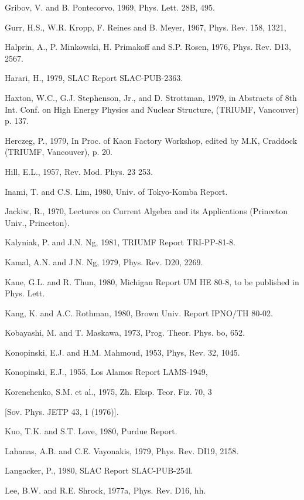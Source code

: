 \documentclass[twoside]{article}
\begin{document}
{{{{{{{{{{{{{{{{\begin{thebibliography}{10}
\bibitem{}
Gribov, V. and B. Pontecorvo, 1969, Phys. Lett. 28B, 495.

\bibitem{}
Gurr, H.S., W.R. Kropp, F. Reines and B. Meyer, 1967, Phys. Rev. 158, 1321,

\bibitem{}
Halprin, A., P. Minkowski, H. Primakoff and S.P. Rosen, 1976, Phys. Rev. D13, 2567.

\bibitem{}
Harari, H., 1979, SLAC Report SLAC-PUB-2363.

\bibitem{}
Haxton, W.C., G.J. Stephenson, Jr., and D. Strottman, 1979, in Abstracts of 8th Int. Conf. on High Energy Physics and Nuclear Structure, (TRIUMF, Vancouver) p. 137.

\bibitem{}
Herczeg, P., 1979, In Proc. of Kaon Factory Workshop, edited by M.K, Craddock (TRIUMF, Vancouver), p. 20.

\bibitem{}
Hill, E.L., 1957, Rev. Mod. Phys. 23 253.

\bibitem{}
Inami, T. and C.S. Lim, 1980, Univ. of Tokyo-Komba Report.

\bibitem{}
Jackiw, R., 1970, Lectures on Current Algebra and its Applications (Princeton Univ., Princeton).

\bibitem{}
Kalyniak, P. and J.N. Ng, 1981, TRIUMF Report TRI-PP-81-8.

\bibitem{}
Kamal, A.N. and J.N. Ng, 1979, Phys. Rev. D20, 2269.

\bibitem{}
Kane, G.L. and R. Thun, 1980, Michigan Report UM HE 80-8, to be published
in Phys. Lett.

\bibitem{}
Kang, K. and A.C. Rothman, 1980, Brown Univ. Report IPNO/TH 80-02.

\bibitem{}
Kobayashi, M. and T. Maskawa, 1973, Prog. Theor. Phys. bo, 652.

\bibitem{}
Konopinski, E.J. and H.M. Mahmoud, 1953, Phys, Rev. 32, 1045.

\bibitem{}
Konopinski, E.J., 1955, Los Alamos Report LAMS-1949,

\bibitem{}
Korenchenko, S.M. et al., 1975, Zh. Eksp. Teor. Fiz. 70, 3 

[Sov. Phys. JETP 43, 1 (1976)].

\bibitem{}
Kuo, T.K. and S.T. Love, 1980, Purdue Report.

\bibitem{}
Lahanas, A.B. and C.E. Vayonakis, 1979, Phys. Rev. DI19, 2158.

\bibitem{}
Langacker, P., 1980, SLAC Report SLAC-PUB-254l.


\bibitem{}
Lee, B.W. and R.E. Shrock, 1977a, Phys. Rev. D16, hh.


\end{thebibliography}}}}}}}}}}}}}}}}}
\end{document}
